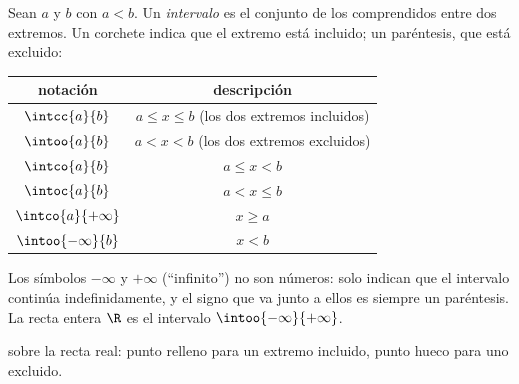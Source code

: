 \begin{definition}[Intervalo]\label{def:g10:numbers:interval}
Sean $a$ y $b$  con $a < b$. Un
\emph{intervalo} es el conjunto de los 
comprendidos entre dos extremos. Un corchete indica que el extremo está
incluido; un paréntesis, que está excluido:
\begin{center}
\begin{tabular}{c|c}
notación & descripción \\
\hline
$\intcc{a}{b}$ & $a \leq x \leq b$ (los dos extremos incluidos) \\
$\intoo{a}{b}$ & $a < x < b$ (los dos extremos excluidos) \\
$\intco{a}{b}$ & $a \leq x < b$ \\
$\intoc{a}{b}$ & $a < x \leq b$ \\
$\intco{a}{+\infty}$ & $x \geq a$ \\
$\intoo{-\infty}{b}$ & $x < b$ \\
\end{tabular}
\end{center}
Los símbolos $-\infty$ y $+\infty$ (``infinito'') no son números: solo
indican que el intervalo continúa indefinidamente, y el signo que va junto
a ellos es siempre un paréntesis. La recta entera $\R$ es el intervalo
$\intoo{-\infty}{+\infty}$.
\end{definition}

\begin{omfigure}

{\small {} sobre la recta real: punto relleno para un extremo
incluido, punto hueco para uno excluido.}
\end{omfigure}

